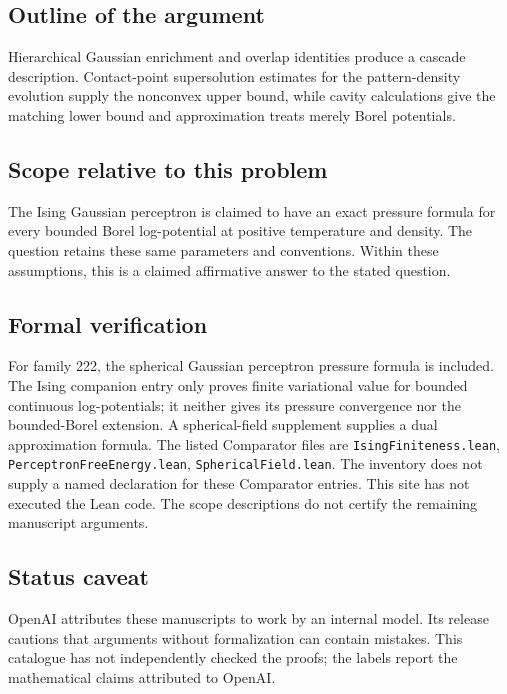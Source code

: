 \documentclass[11pt]{article}
\begin{document}
\subsection{Outline of the argument}
Hierarchical Gaussian enrichment and overlap identities produce a cascade description. Contact-point supersolution estimates for the pattern-density evolution supply the nonconvex upper bound, while cavity calculations give the matching lower bound and approximation treats merely Borel potentials.

\subsection{Scope relative to this problem}
The Ising Gaussian perceptron is claimed to have an exact pressure formula for every bounded Borel log-potential at positive temperature and density. The question retains these same parameters and conventions. Within these assumptions, this is a claimed affirmative answer to the stated question.

\subsection{Formal verification}
For family 222, the spherical Gaussian perceptron pressure formula is included. The Ising companion entry only proves finite variational value for bounded continuous log-potentials; it neither gives its pressure convergence nor the bounded-Borel extension. A spherical-field supplement supplies a dual approximation formula. The listed Comparator files are \texttt{IsingFiniteness.lean}, \texttt{PerceptronFreeEnergy.lean}, \texttt{SphericalField.lean}. The inventory does not supply a named declaration for these Comparator entries. This site has not executed the Lean code. The scope descriptions do not certify the remaining manuscript arguments.

\subsection{Status caveat}
OpenAI attributes these manuscripts to work by an internal model. Its release cautions that arguments without formalization can contain mistakes. This catalogue has not independently checked the proofs; the labels report the mathematical claims attributed to OpenAI.
\end{document}
